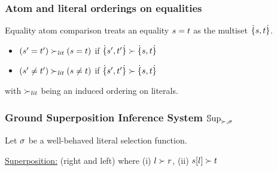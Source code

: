 

           \begin{frame}\frametitle{Atom and literal orderings on equalities}

Equality atom comparison treats an equality $s = t$ as the multiset
${\protect\dot{\{}s,t\protect\dot{\}}}$.

\begin{itemize}
\item \alert{$(s' = t') \succ_{\mathit{lit}} (s = t)$} if
      ${{\protect\dot{\{}s',t'\protect\dot{\}}} \succ {\protect\dot{\{}s,t\protect\dot{\}}}}$
\item \alert{$(s' \neq t') \succ_{\mathit{lit}} (s \neq t)$} if
      ${{\protect\dot{\{}s',t'\protect\dot{\}}} \succ {\protect\dot{\{}s,t\protect\dot{\}}}}$
\end{itemize}


with $\succ_{\mathit{lit}}$  being an induced ordering on literals. 

                                \end{frame}




      \begin{frame}\frametitle{Ground Superposition Inference System ${\mathbb{S}\mathrm{up}_{\succ,\sigma}}$}

\small Let $\sigma$ be a well-behaved literal selection function. 

\alert{\underline{Superposition:}} (right and left)
where (i) ${l \succ r}$, (ii) ${s[l] \succ t}$ 

\smallskip


\smallskip


                                \end{frame}


